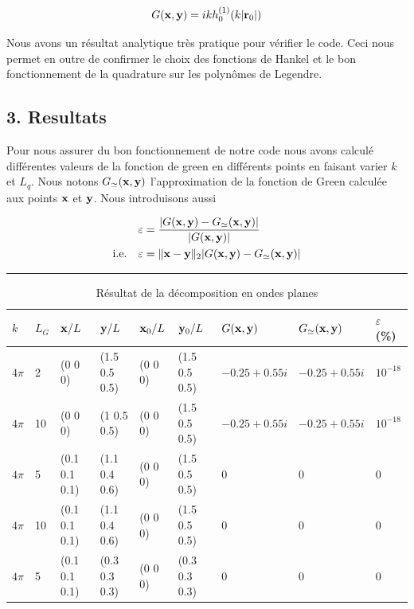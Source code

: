 \documentclass[10pt]{article}
\begin{document}
\begin{multicols}{2}
\begin{equation}
G({\bf x},{\bf y}) = ikh^{(1)}_{0}(k|{\bf r}_0|)
\end{equation}

Nous avons un résultat analytique très pratique pour vérifier le code. Ceci nous permet en outre de confirmer le choix des fonctions de Hankel et le bon fonctionnement de la quadrature sur les polynômes de Legendre. 



\vspace*{10pt}

\subsection*{3. Resultats}

Pour nous assurer du bon fonctionnement de notre code nous avons calculé différentes valeurs de la fonction de green en différents points en faisant varier $k$ et $L_q$. Nous notons $G_{\simeq}({\bf x}, {\bf y})$ l'approximation de la fonction de Green calculée aux points ${\bf x}$ et ${\bf y}$.  Nous introduisons aussi 


\begin{align}
 \varepsilon & = \frac{|G({\bf x}, {\bf y}) - G_{\simeq}({\bf x}, {\bf y})|}{|G({\bf x}, {\bf y})|} \\
 \text{i.e.} \quad \varepsilon & = \|{\bf x} -{\bf y}\|_{2}|G({\bf x}, {\bf y}) - G_{\simeq}({\bf x}, {\bf y})|
\end{align}


\end{multicols}

\rule{8cm}{1pt}

\begin{table}[H]
\centering
\begin{tabular}{m{0.5cm} m{0.5cm} | m{2cm} m{2cm} m{2cm} m{2cm} | m{2cm} m{2cm} m{1cm}} 
   \hline
    $k$ & $L_G$ & ${\bf x}/L$ & ${\bf y}/L$ & ${\bf x}_0/L$ & ${\bf y}_0/L$ & $G({\bf x}, {\bf y})$ & $G_{\simeq}({\bf x},{\bf y})$ & $\varepsilon$ (\%) \\
    \toprule
    \toprule
    $4\pi$ & 2 & (0 0 0) & (1.5 0.5 0.5) & (0 0 0) & (1.5 0.5 0.5) & $-0.25 + 0.55i$ & $-0.25 + 0.55i$ & $10^{-18}$\\
    $4\pi$ & 10 & (0 0 0) & (1 0.5 0.5) & (0 0 0) & (1.5 0.5 0.5) & $-0.25 + 0.55i$ & $-0.25 + 0.55i$ & $10^{-18}$\\ \hline
    $4\pi$ & 5 & (0.1 0.1 0.1) & (1.1 0.4 0.6) & (0 0 0) & (1.5 0.5 0.5) & 0 & 0 & 0\\
    $4\pi$ & 10 & (0.1 0.1 0.1) & (1.1 0.4 0.6) & (0 0 0) & (1.5 0.5 0.5) & 0 & 0 & 0\\ \hline
    $4\pi$ & 5 & (0.1 0.1 0.1) & (0.3 0.3 0.3) & (0 0 0) & (0.3 0.3 0.3) & 0 & 0 & 0\\
    \hline
\end{tabular}
\caption{Résultat de la décomposition en ondes planes}
\end{table}
\end{document}
